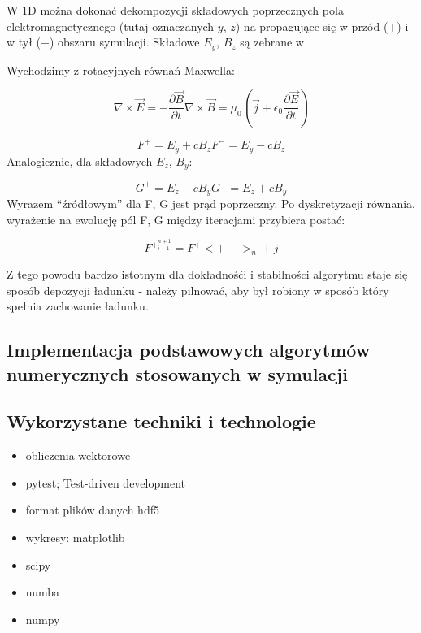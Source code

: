W 1D można dokonać dekompozycji składowych poprzecznych pola elektromagnetycznego (tutaj oznaczanych $y$, $z$) na
propagujące się w przód ($+$) i w tył ($-$) obszaru symulacji. Składowe $E_y$, $B_z$ są zebrane w %

Wychodzimy z rotacyjnych równań Maxwella:

\begin{equation}
    \nabla \times \vec{E} = -\frac{\partial \vec{B}}{\partial t}
    \nabla \times \vec{B} = \mu_0 (\vec{j} + \epsilon_0 \frac{\partial \vec{E}}{\partial t})
    \label{eqn:Maxwell-rotation-derivation}
\end{equation}


\begin{equation}
    F^{+} = E_y + c B_z
    F^{-} = E_y - c B_z
    \label{eqn:Birdsall-electromagnetic-quantities}
\end{equation}
Analogicznie, dla składowych $E_z$, $B_y$:

\begin{equation}
    G^{+} = E_z - c B_y
    G^{-} = E_z + c B_y
    \label{eqn:Birdsall-electromagnetic-quantities-alternate-axes}
\end{equation}
Wyrazem ``źródłowym'' dla F, G jest prąd poprzeczny. Po dyskretyzacji równania, wyrażenie na ewolucję pól F, G między
iteracjami przybiera postać:

\begin{equation}
    F^{+}^{n+1}_{i+1} = F^{+}<++>_{n} + j%
\end{equation}

Z tego powodu bardzo istotnym dla dokładnośći i stabilności algorytmu staje się sposób depozycji ładunku - należy pilnować,
aby był robiony w sposób który spełnia zachowanie ładunku.

\subsection{Implementacja podstawowych algorytmów numerycznych stosowanych w symulacji}

\subsection{Wykorzystane techniki i technologie}
\begin{itemize}
    \item obliczenia wektorowe
    \item pytest; Test-driven development
    \item format plików danych hdf5
    \item wykresy: matplotlib
    \item scipy
    \item numba
    \item numpy
\end{itemize}

